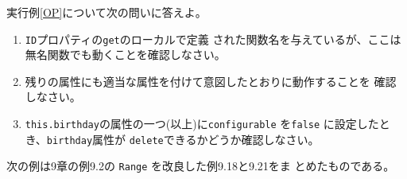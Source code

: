 \begin{Prob}\upshape
	実行例\ref{OP}について次の問いに答えよ。
	\begin{enumerate}
	 \item \texttt{ID}プロパティの\texttt{get}のローカルで定義
	された関数名を与えているが、ここは無名関数でも動くことを確認しなさい。
	 \item 残りの属性にも適当な属性を付けて意図したとおりに動作することを
				 確認しなさい。
	 \item \texttt{this.birthday}の属性の一つ(以上)に\texttt{configurable}
				 を\texttt{false} に設定したとき、\texttt{birthday}属性が
				 \texttt{delete}できるかどうか確認しなさい。
	\end{enumerate}
 \end{Prob}
\iffalse
次の例は\cite{JS6}9章の例9.2の \texttt{Range} を改良した例9.18と9.21をま
とめたものである。
